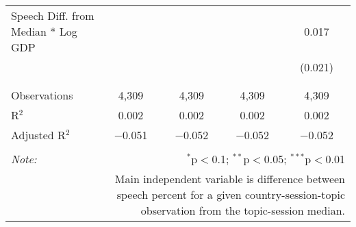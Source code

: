 \begin{table}[!htbp]
\begin{tabular}{@{\extracolsep{5pt}}lcccc}
 Speech Diff. from Median * Log GDP &  &  &  & 0.017 \\ 
  &  &  &  & (0.021) \\ 
  & & & & \\ 
\hline \\[-1.8ex] 
Observations & 4,309 & 4,309 & 4,309 & 4,309 \\ 
R$^{2}$ & 0.002 & 0.002 & 0.002 & 0.002 \\ 
Adjusted R$^{2}$ & $-$0.051 & $-$0.052 & $-$0.052 & $-$0.052 \\ 
\hline 
\hline \\[-1.8ex] 
\textit{Note:}  & \multicolumn{4}{r}{$^{*}$p$<$0.1; $^{**}$p$<$0.05; $^{***}$p$<$0.01} \\ 
 & \multicolumn{4}{r}{Main independent variable is difference between speech percent for a given country-session-topic observation from the topic-session median.} \\ 
\end{tabular} 
\end{table} 
